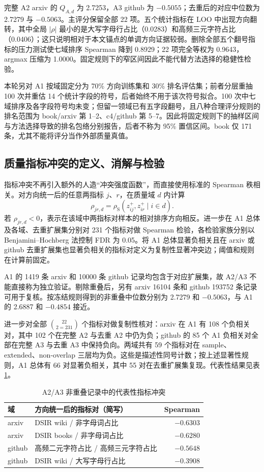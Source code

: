 完整 A2 arxiv 的 $Q_{A,d}$ 为 2.7253，A3 github 为 $-0.5055$；去重后的对应中位数为 2.7279 与 $-0.5063$。主评分保留全部 22 项。五个统计指标在 LOO 中出现方向翻转，其中全局 $|\rho|$ 最小的是大写字母行占比（0.0283）和高频三元字符占比（0.0406）；这只说明相对于本文锚点的单调方向证据较弱。删除全部五个翻号指标的压力测试使七域排序 Spearman 降到 0.8929；22 项完全等权为 0.9643，argmax 压缩为 1.0000。固定规则下的窄区间因此不能代替方法选择的稳健性检验。

本轮另对 A1 按域固定分为 70\% 方向训练集和 30\% 排名评估集；前者分层重抽 100 次并重估 14 个统计字段的符号，后者始终不用于该次符号拟合。100 次中七域排序及各字段符号均未变；但留一领域已有五字段翻号，且八种合理评分规则的排名范围为 book/arxiv 第 1--2、c4/github 第 5--7。因此将固定规则下的抽样区间与方法选择导致的排名包络分别报告，后者不称为 95\% 置信区间。book 仅 171 条，尤其不能将评分当作外部质量真值。
\subsection{质量指标冲突的定义、消解与检验}

指标冲突不再引入额外的人造“冲突强度函数”，而直接使用标准的 Spearman 秩相关。对方向统一后的任意两指标 $j$、$r$，在质量域 $d$ 内计算
\begin{equation}
\rho_{jr,d}
=
\rho_{\mathrm S}(z^+_{ij},z^+_{ir}\mid i\in d).
\label{eq:q1_pair_spearman}
\end{equation}
若 $\rho_{jr,d}<0$，表示在该域中两指标对样本的相对排序方向相反。进一步在 A1 总体及各域、去重扩展集分别对 231 个指标对做 Spearman 检验，各检验家族分别以 Benjamini--Hochberg 法控制 FDR 为 0.05。将 A1 总体显著负相关且在 arxiv 或 github 去重扩展集也显著负相关的指标对定义为复制性显著冲突边；阈值和规则在计算前固定。

A1 的 1419 条 arxiv 和 10000 条 github 记录均包含于对应扩展集，故 A2/A3 不能直接称为独立验证。剔除重叠后，另有 arxiv 16104 条和 github 193752 条记录可用于复核。按冻结规则得到的非重叠中位数分别为 2.7279 和 $-0.5063$，与 A1 的 2.6887 和 $-0.4854$ 接近。

进一步对全部 $22\choose2=231$ 个指标对做复制性核对：arxiv 在 A1 有 108 个负相关对，其中 102 个在完整 A2 与去重 A2 中仍为负；github 的 85 个 A1 负相关对全部在完整 A3 与去重 A3 中保持负向。两域共有 59 个指标对在 sample、extended、non-overlap 三层均为负。这些是描述性同号计数；按上述显著性规则，A1 总体有 66 对显著负相关，其中 55 对在去重扩展集复现。代表性结果见表\ref{tab:q1_conflict}。

\begin{table}[htbp]
\centering\small
\caption{A2/A3 非重叠记录中的代表性指标冲突}
\label{tab:q1_conflict}
\begin{tabular}{llr}
\toprule
域 & 方向统一后的指标对（简写） & Spearman \\
\midrule
arxiv & DSIR wiki / 非字母词占比 & $-0.6303$ \\
arxiv & DSIR books / 非字母词占比 & $-0.6280$ \\
github & 高频二元字符占比 / 高频三元字符占比 & $-0.5648$ \\
github & DSIR wiki / 大写字母行占比 & $-0.3908$ \\
\bottomrule
\end{tabular}
\end{table}

